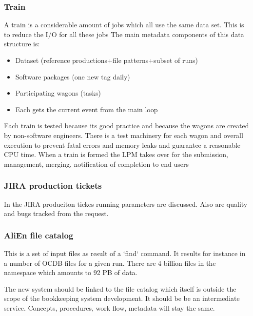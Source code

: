 \subsubsection{Train}
A train is a considerable amount of jobs which all use the same data set. This is to reduce the I/O for all these jobs
The main metadata components of this data structure is:
\begin{itemize}
  \item Dataset (reference productions+file patterns+subset of runs)
  \item Software packages (one new tag daily)
  \item Participating wagons (tasks)
  \item Each gets the current event from the main loop
\end{itemize}
Each train is tested because its good practice and because the wagons are created by non-software engineers. There is a test machinery for each wagon and overall execution to prevent fatal errors and memory leaks and guarantee a reasonable CPU time. When a train is formed the LPM takes over for the submission, management, merging, notification of completion to end users

\subsubsection{JIRA production tickets}
In the JIRA produciton tickes running parameters are discussed. Also are quality and bugs tracked from the request.

\subsubsection{AliEn file catalog}
This is a set of input files as result of a `find` command. It results for instance in a number of OCDB files for a given run. There are 4 billion files in the namespace which amounts to 92 PB of data.

The new system should be linked to the file catalog which itself is outside the scope of the bookkeeping system development. It should be be an intermediate service. Concepts, procedures, work flow, metadata will stay the same.
 
